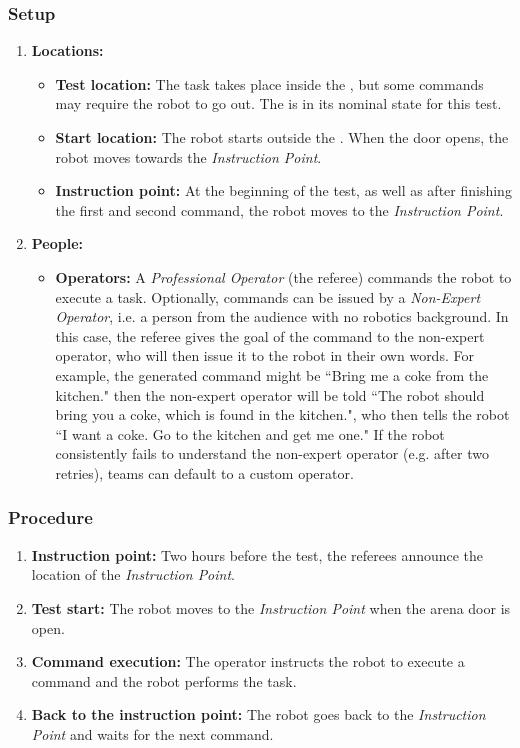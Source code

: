 \subsubsection*{Setup}
\begin{enumerate}
    \item \textbf{Locations:}
		\begin{itemize}
			\item \textbf{Test location:} The task takes place inside the \Arena{}, but some commands may require the robot to go out. The \Arena{} is in its nominal state for this test.
			\item \textbf{Start location:} The robot starts outside the \Arena{}. When the door opens, the robot moves towards the \textit{Instruction Point}.
			\item \textbf{Instruction point:} At the beginning of the test, as well as after finishing the first and second command, the robot moves to the \textit{Instruction Point}.
		\end{itemize}
	\item \textbf{People:}
		\begin{itemize}
			\item \textbf{Operators:} A \emph{Professional Operator} (the referee) commands the robot to execute a task.
			Optionally, commands can be issued by a \emph{Non-Expert Operator}, i.e. a person from the audience with no robotics background.
			In this case, the referee gives the goal of the command to the non-expert operator, who will then issue it to the robot in their own words. For example, the generated command might be ``Bring me a coke from the kitchen." then the non-expert operator will be told ``The robot should bring you a coke, which is found in the kitchen.", who then tells the robot ``I want a coke. Go to the kitchen and get me one."
			If the robot consistently fails to understand the non-expert operator (e.g. after two retries), teams can default to a custom operator.
		\end{itemize}
\end{enumerate}


\subsubsection*{Procedure}
\begin{enumerate}[nosep]
	\item \textbf{Instruction point:} Two hours before the test, the referees announce the location of the \textit{Instruction Point}.
	\item \textbf{Test start:} The robot moves to the \textit{Instruction Point} when the arena door is open.
	\item \textbf{Command execution:} The operator instructs the robot to execute a command and the robot performs the task.
	\item \textbf{Back to the instruction point:} The robot goes back to the \textit{Instruction Point} and waits for the next command.
\end{enumerate}


